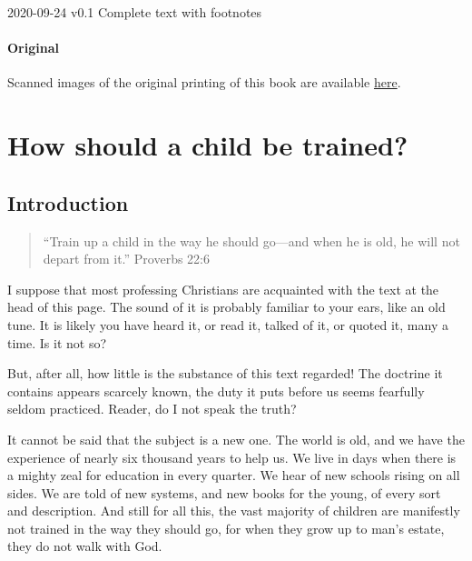 \documentclass[
]{book}
\begin{document}
2020-09-24 \textbar{} v0.1 \textbar{} Complete text with footnotes

\hypertarget{original}{%
\subsubsection*{Original}\label{original}}

Scanned images of the original printing of this book are available \href{https://www.google.com/books/edition/Wheat_Or_Chaff/il5QAQAAMAAJ?hl=en\&gbpv=1\&pg=PA219\&printsec=frontcover}{here}.

\clearpage
\setcounter{page}{1}

\hypertarget{how-should-a-child-be-trained}{%
\chapter*{How should a child be trained?}\label{how-should-a-child-be-trained}}

\hypertarget{introduction}{%
\section*{Introduction}\label{introduction}}

\begin{quote}
``Train up a child in the way he should go---and when he is old, he will not depart from it.'' Proverbs 22:6
\end{quote}

I suppose that most professing Christians are acquainted with the text at the head of this page. The sound of it is probably familiar to your ears, like an old tune. It is likely you have heard it, or read it, talked of it, or quoted it, many a time. Is it not so?

But, after all, how little is the substance of this text regarded! The doctrine it contains appears scarcely known, the duty it puts before us seems fearfully seldom practiced. Reader, do I not speak the truth?

It cannot be said that the subject is a new one. The world is old, and we have the experience of nearly six thousand years to help us. We live in days when there is a mighty zeal for education in every quarter. We hear of new schools rising on all sides. We are told of new systems, and new books for the young, of every sort and description. And still for all this, the vast majority of children are manifestly not trained in the way they should go, for when they grow up to man's estate, they do not walk with God.
\end{document}
